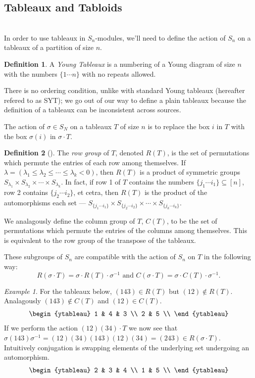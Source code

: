 \documentclass[12pt,twoside]{reedthesis}
\theoremstyle{plain}   %
\theoremstyle{definition}
\newtheorem{defn}{Definition}[section]
\theoremstyle{remark}
\newtheorem{ex}{Example}[section]
\numberwithin{equation}{section}
\begin{document}
  \subsection{Tableaux and Tabloids} \hfill\\
  In order to use tableaux in $S_n$-modules, we'll need to define the action of $S_n$ on a tableaux of a partition of size $n$.
  \begin{defn}
    A \emph{Young Tableaux} is a numbering of a Young diagram of size $n$ with the numbers $\{1 \cdots n\}$ with no
    repeats allowed. \par
    There is no ordering condition, unlike with standard Young tableaux (hereafter refered to as SYT);
    we go out of our way to define a plain tableaux because the definition of a tableaux can be inconsistent across sources.
  \end{defn}
  The action of $\sigma \in S_N$ on a tableaux $T$ of size $n$ is to replace the box $i$ in $T$ with the box $\sigma(i)$ in $\sigma \cdot T$.
  \begin{defn}[{\cite[Pg. 84]{fulton}}]
    The \emph{row group} of $T$, denoted $R(T)$, is the set of permutations which permute the entries of each row among themselves.
    If $\lambda = ( \lambda_1 \leq \lambda_2 \leq \cdots \leq \lambda_k < 0)$, then $R(T)$ is a product of symmetric groups
    $S_{\lambda_1} \times S_{\lambda_2} \times \cdots \times S_{\lambda_k}$.
    In fact, if row 1 of $T$ contains the numbers $\{ j_1 \cdots i_1\} \subseteq [n]$, row 2 contains $\{j_2 \cdots i_2 \}$, et cetra,
    then $R(T)$ is the product of the automorphisms each set --- $S_{\{ j_1 \cdots i_1\}} \times S_{\{ j_2 \cdots i_2\}} \times \cdots \times S_{\{ j_k \cdots i_k\}}$.\par
    We analagously define the column group of $T$, $C(T)$, to be the set of permutations which permute the entries of the columns among themselves.
    This is equivalent to the row group of the transpose of the tableaux.
  \end{defn}
  These subgroups of $S_n$ are compatible with the action of $S_n$ on $T$ in the following way:
  \[ R(\sigma \cdot T) = \sigma \cdot R(T) \cdot \sigma^{-1} \text{ and } C(\sigma \cdot T) = \sigma \cdot C(T) \cdot \sigma^{-1}.\]
  \begin{ex}
    For the tableaux below,
    $(143) \in R(T)$ but $(12) \notin R(T)$.
    Analagously $(143) \notin C(T)$ and $(12) \in C(T)$.
    \[
      \begin{ytableau}
        1 & 4 & 3 \\
        2 & 5 \\
      \end{ytableau}
    \]
    If we perform the action $(12)(34) \cdot T$ we now see that $\sigma (143) \sigma^{-1} = (12)(34) (143) (12)(34) = (243) \in R(\sigma \cdot T)$.
    Intuitively conjugation is swapping elements of the underlying set undergoing an automorphism.
    \[
      \begin{ytableau}
        2 & 3 & 4 \\
        1 & 5 \\
      \end{ytableau}
    \]
  \end{ex}
\end{document}
